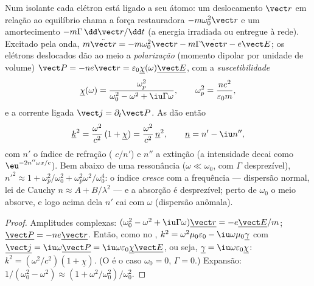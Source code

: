 \begin{proposition}\label{prop:b2:waves-in-media:lorentz}
Num isolante cada elétron está ligado a seu átomo: um deslocamento
$\vect r$ em relação ao equilíbrio chama a força restauradora $-m\omega_0^2\vect r$ e
um amortecimento $-m\Gamma\,\dd\vect r/\dd t$ (a energia irradiada ou entregue à
rede). Excitado pela onda, $m\ddot{\vect r} = -m\omega_0^2\vect r - m\Gamma\dot{\vect r}
- e\vect E$; os elétrons deslocados dão ao meio a \emph{polarização}
(momento dipolar por unidade de volume) $\vect P = -ne\vect r = \varepsilon_0\underline\chi(\omega)
\underline{\vect E}$, com a \emph{suscetibilidade}
\[
\underline\chi(\omega) = \frac{\omega_p^2}{\omega_0^2 - \omega^2 + \iu\Gamma\omega} ,
\qquad \omega_p^2 = \frac{ne^2}{\varepsilon_0m} ,
\]
e a corrente ligada $\vect j = \partial_t\vect P$. As  dão então
\[
\underline k^2 = \frac{\omega^2}{c^2}\,(1 + \underline\chi) = \frac{\omega^2}{c^2}\,\underline n^2 ,
\qquad \underline n = n' - \iu n'' ,
\]
com $n'$ o índice de refração ( $c/n'$) e $n''$ a
extinção (a intensidade decai como $\eu^{-2n''\omega x/c}$). Bem abaixo de uma
ressonância ($\omega \ll \omega_0$, com $\Gamma$ desprezível), $n'^2 \approx 1 + \omega_p^2/\omega_0^2 +
\omega_p^2\omega^2/\omega_0^4$: o índice \emph{cresce} com a frequência --- dispersão
normal, lei de Cauchy $n \approx A + B/\lambda^2$ --- e a absorção é
desprezível; perto de $\omega_0$ o meio absorve, e logo acima dela $n'$
cai com $\omega$ (dispersão anômala).
\end{proposition}

\begin{proof}
Amplitudes complexas: $(\omega_0^2 - \omega^2 + \iu\Gamma\omega)\underline{\vect r} = -e\underline{\vect E}
/m$; $\underline{\vect P} = -ne\underline{\vect r}$. Então, como no , $k^2 = \omega^2\mu_0
\varepsilon_0 - \iu\omega\mu_0\underline\gamma$ com $\underline{\vect j} = \iu\omega\underline{\vect P} = \iu\omega\varepsilon_0
\underline\chi\underline{\vect E}$, ou seja, $\underline\gamma = \iu\omega\varepsilon_0\underline\chi$: $k^2 = (\omega^2/c^2)
(1 + \underline\chi)$. (O  é o caso $\omega_0 = 0$, $\Gamma = 0$.)
Expansão: $1/(\omega_0^2 - \omega^2) \approx (1 + \omega^2/\omega_0^2)/\omega_0^2$.
\end{proof}

